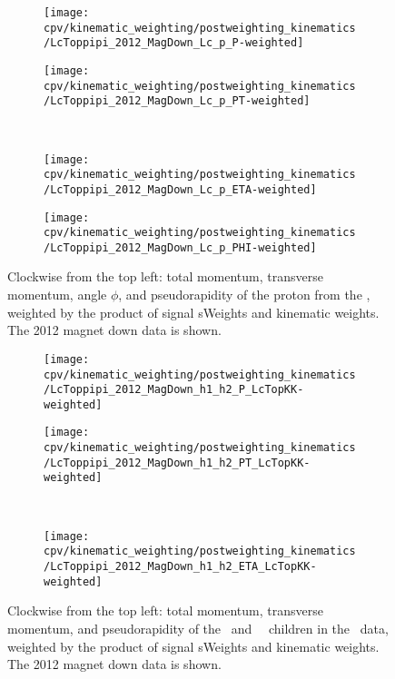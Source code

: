 \begin{figure}
  \begin{subfigure}[b]{0.4\textwidth}
    \texttt{[image: cpv/kinematic\_weighting/postweighting\_kinematics/LcToppipi\_2012\_MagDown\_Lc\_p\_P-weighted]}
    \label{fig:cpv:kinematic_weighting:post:Lc_p:P}
  \end{subfigure}
  \begin{subfigure}[b]{0.4\textwidth}
    \texttt{[image: cpv/kinematic\_weighting/postweighting\_kinematics/LcToppipi\_2012\_MagDown\_Lc\_p\_PT-weighted]}
    \label{fig:cpv:kinematic_weighting:post:Lc_p:PT}
  \end{subfigure}\\
  \begin{subfigure}[b]{0.4\textwidth}
    \texttt{[image: cpv/kinematic\_weighting/postweighting\_kinematics/LcToppipi\_2012\_MagDown\_Lc\_p\_ETA-weighted]}
    \label{fig:cpv:kinematic_weighting:post:Lc_p:ETA}
  \end{subfigure}
  \begin{subfigure}[b]{0.4\textwidth}
    \texttt{[image: cpv/kinematic\_weighting/postweighting\_kinematics/LcToppipi\_2012\_MagDown\_Lc\_p\_PHI-weighted]}
    \label{fig:cpv:kinematic_weighting:post:Lc_p:PHI}
  \end{subfigure}
  \caption{%
    Clockwise from the top left: total momentum, transverse momentum, angle 
    $\phi$, and pseudorapidity of the proton from the \PLambdac, weighted by 
    the product of signal sWeights and kinematic weights.
    The 2012 magnet down data is shown.
  }
  \label{fig:cpv:kinematic_weighting:post:Lc_p}
\end{figure}

\begin{figure}
  \begin{subfigure}[b]{0.5\textwidth}
    \centering
    \texttt{[image: cpv/kinematic\_weighting/postweighting\_kinematics/LcToppipi\_2012\_MagDown\_h1\_h2\_P\_LcTopKK-weighted]}
    \label{fig:cpv:kinematic_weighting:post:pKK_h1h2:P}
  \end{subfigure}
  \begin{subfigure}[b]{0.5\textwidth}
    \centering
    \texttt{[image: cpv/kinematic\_weighting/postweighting\_kinematics/LcToppipi\_2012\_MagDown\_h1\_h2\_PT\_LcTopKK-weighted]}
    \label{fig:cpv:kinematic_weighting:post:pKK_h1h2:PT}
  \end{subfigure}\\
  \begin{subfigure}[b]{\textwidth}
    \centering
    \texttt{[image: cpv/kinematic\_weighting/postweighting\_kinematics/LcToppipi\_2012\_MagDown\_h1\_h2\_ETA\_LcTopKK-weighted]}
    \label{fig:cpv:kinematic_weighting:post:pKK_h1h2:ETA}
  \end{subfigure}
  \caption{%
    Clockwise from the top left: total momentum, transverse momentum, and 
    pseudorapidity of the \PKminus\ and \PKplus\ \PLambdac\ children in the 
    \pKK\ data, weighted by the product of signal sWeights and kinematic 
    weights.
    The 2012 magnet down data is shown.
  }
  \label{fig:cpv:kinematic_weighting:post:pKK_h1h2}
\end{figure}

